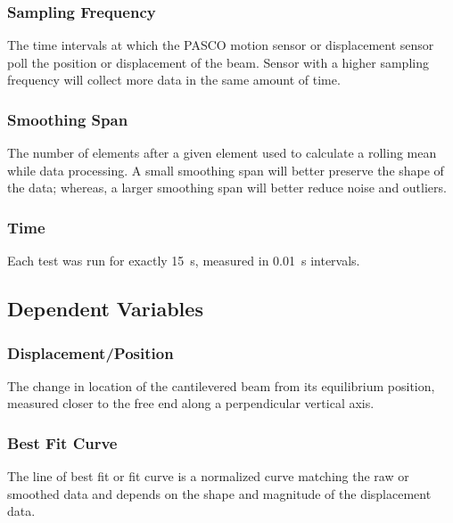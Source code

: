 \documentclass[12 pt]{report}
\begin{document}
\subsubsection{Sampling Frequency} \label{sampling_frequency}
The time intervals at which the PASCO motion sensor or displacement sensor poll the position or displacement of the beam. Sensor with a higher sampling frequency will collect more data in the same amount of time.

\subsubsection{Smoothing Span} \label{smoothing_span}
The number of elements after a given element used to calculate a rolling mean while data processing. A small smoothing span will better preserve the shape of the data; whereas, a larger smoothing span will better reduce noise and outliers.

\subsubsection{Time} \label{time}
Each test was run for exactly \qty{15}{s}, measured in \qty{0.01}{s} intervals.

\subsection{Dependent Variables} \label{dependent_variables}
\subsubsection{Displacement/Position} \label{displacement-position}
The change in location of the cantilevered beam from its equilibrium position, measured closer to the free end along a perpendicular vertical axis.

\subsubsection{Best Fit Curve} \label{best_fit_curve}
The line of best fit or fit curve is a normalized curve matching the raw or smoothed data and depends on the shape and magnitude of the displacement data.
\end{document}
